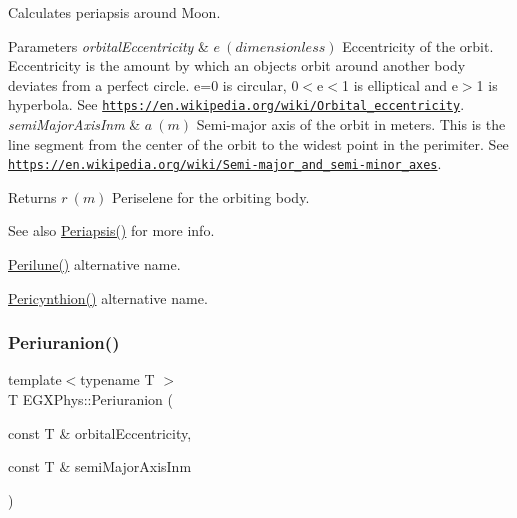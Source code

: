 Calculates periapsis around Moon. 


\begin{DoxyParams}{Parameters}
{\em orbital\+Eccentricity} & $ e\ (dimensionless)$ Eccentricity of the orbit. Eccentricity is the amount by which an objects orbit around another body deviates from a perfect circle. e=0 is circular, 0$<$e$<$1 is elliptical and e$>$1 is hyperbola. See \href{https://en.wikipedia.org/wiki/Orbital_eccentricity}{\tt https\+://en.\+wikipedia.\+org/wiki/\+Orbital\+\_\+eccentricity}. \\
\hline
{\em semi\+Major\+Axis\+Inm} & $ a\ (m)$ Semi-\/major axis of the orbit in meters. This is the line segment from the center of the orbit to the widest point in the perimiter. See \href{https://en.wikipedia.org/wiki/Semi-major_and_semi-minor_axes}{\tt https\+://en.\+wikipedia.\+org/wiki/\+Semi-\/major\+\_\+and\+\_\+semi-\/minor\+\_\+axes}. \\
\hline
\end{DoxyParams}
\begin{DoxyReturn}{Returns}
$ r\ (m)$ Periselene for the orbiting body. 
\end{DoxyReturn}
\begin{DoxySeeAlso}{See also}
\mbox{\hyperlink{group___e_g_x_phys-_periapsis_gad487212733711bc2ce73c8137c9309c3}{Periapsis()}} for more info. 

\mbox{\hyperlink{group___e_g_x_phys-_periapsis_gac305fe72a19c1126bc7e72ef1de873a0}{Perilune()}} alternative name. 

\mbox{\hyperlink{group___e_g_x_phys-_periapsis_ga101f47cc9ce1eb98aeec35fa5c9ba9e4}{Pericynthion()}} alternative name. 
\end{DoxySeeAlso}
\mbox{\label{group___e_g_x_phys-_periapsis_ga655892453dddf80d0e60c66c1b8279fd}} 
\subsubsection{\texorpdfstring{Periuranion()}{Periuranion()}}
{\footnotesize\ttfamily template$<$typename T $>$ \\
T E\+G\+X\+Phys\+::\+Periuranion (\begin{DoxyParamCaption}\item[{const T \&}]{orbital\+Eccentricity,  }\item[{const T \&}]{semi\+Major\+Axis\+Inm }\end{DoxyParamCaption})}



